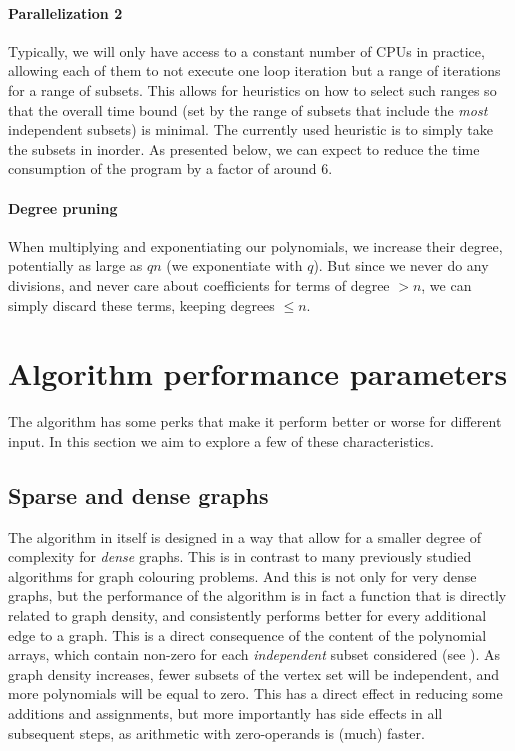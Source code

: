 \documentclass[a4paper]{article}
\begin{document}
\paragraph{Parallelization 2} Typically, we will only have access to a constant number of CPUs in practice, allowing each of them to not execute one loop iteration but a range of iterations for a range of subsets. This allows for heuristics on how to select such ranges so that the overall time bound (set by the range of subsets that include the \emph{most} independent subsets) is minimal. The currently used heuristic is to simply take the subsets in inorder. As presented below, we can expect to reduce the time consumption of the program by a factor of around 6.

\paragraph{Degree pruning} When multiplying and exponentiating our polynomials, we increase their degree, potentially as large as $qn$ (we exponentiate with $q$). But since we never do any divisions, and never care about coefficients for terms of degree $> n$, we can simply discard these terms, keeping degrees $\leq n$.

\section{Algorithm performance parameters}
The algorithm has some perks that make it perform better or worse for different input. In this section we aim to explore a few of these characteristics.

\subsection{Sparse and dense graphs}\label{sparsedense}
The algorithm in itself is designed in a way that allow for a smaller degree of complexity for \emph{dense} graphs. This is in contrast to many previously studied algorithms for graph colouring problems. And this is not only for very dense graphs, but the performance of the algorithm is in fact a function that is directly related to graph density, and consistently performs better for every additional edge to a graph. This is a direct consequence of the content of the polynomial arrays, which contain non-zero for each \emph{independent} subset considered (see \cite[p. 9, steps 2b and 2c]{cov_pack}). As graph density increases, fewer subsets of the vertex set will be independent, and more polynomials will be equal to zero. This has a direct effect in reducing some additions and assignments, but more importantly has side effects in all subsequent steps, as arithmetic with zero-operands is (much) faster.
\end{document}
